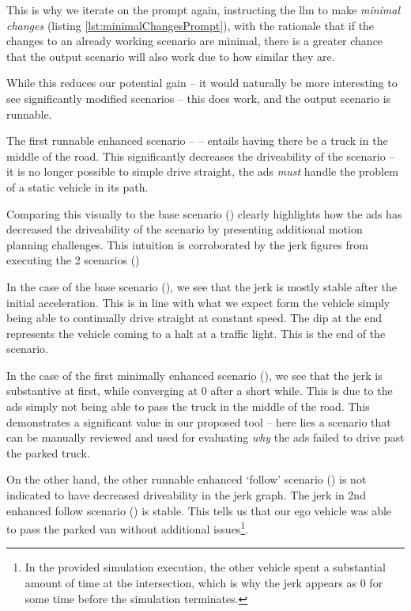 This is why we iterate on the prompt again, instructing the \acrshort{llm} to make \emph{minimal
    changes} (listing \ref{lst:minimalChangesPrompt}), with the rationale that if the changes to an
already working scenario are minimal, there is a greater chance that the output scenario will also
work due to how similar they are.

While this reduces our potential gain -- it would naturally be more interesting to see significantly
modified scenarios -- this does work, and the output scenario is runnable.

The first runnable enhanced scenario --  -- entails
having there be a truck in the middle of the road. This significantly decreases the driveability of
the scenario -- it is no longer possible to simple drive straight, the \acrshort{ads} \emph{must}
handle the problem of a static vehicle in its path.


Comparing this visually to the base scenario () clearly highlights
how the \acrshort{ads} has decreased the driveability of  the scenario by presenting additional
motion planning challenges. This intuition is corroborated by the jerk figures from executing the
\num{2} scenarios ()

In the case of the base scenario (), we see that the jerk is mostly stable
after the initial acceleration. This is in line with what we expect form the vehicle simply being
able to continually drive straight at constant speed. The dip at the end represents the vehicle coming to a halt at a traffic light. This is the end of the
scenario.

In the case of the first minimally enhanced scenario (), we
see that the jerk is substantive at first, while converging at \num{0} after a short while. This is
due to the \acrshort{ads} simply not being able to pass the truck in the middle of the road. This
demonstrates a significant value in our proposed tool -- here lies a scenario that can be manually
reviewed and used for evaluating \emph{why} the \acrshort{ads} failed to drive past the parked truck.

On the other hand, the other runnable enhanced `follow' scenario
() is not indicated to have decreased driveability in
the jerk graph. The jerk in 2nd enhanced follow scenario ()
is stable. This tells us that our ego vehicle was able to pass the parked van without additional
issues\footnote{In
    the provided simulation execution, the other vehicle spent a substantial amount of time at the
    intersection, which is why the jerk appears as \num{0} for some time before the simulation
    terminates.}.

